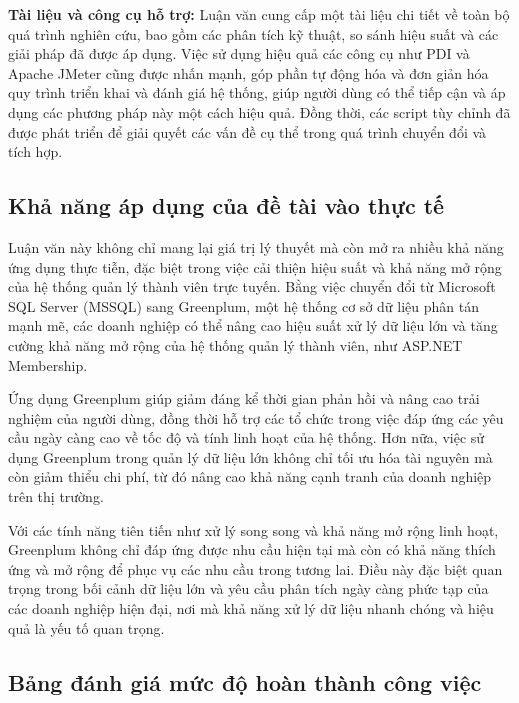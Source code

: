 \textbf{Tài liệu và công cụ hỗ trợ:} Luận văn cung cấp một tài liệu chi tiết về toàn bộ quá trình nghiên cứu, bao gồm các phân tích kỹ thuật, so sánh hiệu suất và các giải pháp đã được áp dụng. Việc sử dụng hiệu quả các công cụ như PDI và Apache JMeter cũng được nhấn mạnh, góp phần tự động hóa và đơn giản hóa quy trình triển khai và đánh giá hệ thống, giúp người dùng có thể tiếp cận và áp dụng các phương pháp này một cách hiệu quả. Đồng thời, các script tùy chỉnh đã được phát triển để giải quyết các vấn đề cụ thể trong quá trình chuyển đổi và tích hợp.

\subsection{Khả năng áp dụng của đề tài vào thực tế}

Luận văn này không chỉ mang lại giá trị lý thuyết mà còn mở ra nhiều khả năng ứng dụng thực tiễn, đặc biệt trong việc cải thiện hiệu suất và khả năng mở rộng của hệ thống quản lý thành viên trực tuyến. Bằng việc chuyển đổi từ Microsoft SQL Server (MSSQL) sang Greenplum, một hệ thống cơ sở dữ liệu phân tán mạnh mẽ, các doanh nghiệp có thể nâng cao hiệu suất xử lý dữ liệu lớn và tăng cường khả năng mở rộng của hệ thống quản lý thành viên, như ASP.NET Membership.

Ứng dụng Greenplum giúp giảm đáng kể thời gian phản hồi và nâng cao trải nghiệm của người dùng, đồng thời hỗ trợ các tổ chức trong việc đáp ứng các yêu cầu ngày càng cao về tốc độ và tính linh hoạt của hệ thống. Hơn nữa, việc sử dụng Greenplum trong quản lý dữ liệu lớn không chỉ tối ưu hóa tài nguyên mà còn giảm thiểu chi phí, từ đó nâng cao khả năng cạnh tranh của doanh nghiệp trên thị trường.

Với các tính năng tiên tiến như xử lý song song và khả năng mở rộng linh hoạt, Greenplum không chỉ đáp ứng được nhu cầu hiện tại mà còn có khả năng thích ứng và mở rộng để phục vụ các nhu cầu trong tương lai. Điều này đặc biệt quan trọng trong bối cảnh dữ liệu lớn và yêu cầu phân tích ngày càng phức tạp của các doanh nghiệp hiện đại, nơi mà khả năng xử lý dữ liệu nhanh chóng và hiệu quả là yếu tố quan trọng.

\subsection{Bảng đánh giá mức độ hoàn thành công việc}

